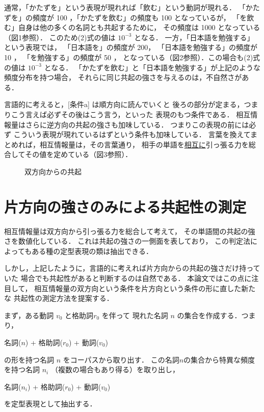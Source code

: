\addtocounter{figure}{2}

\bigskip 

\bigskip

通常，「かたずを」という表現が現れれば「飲む」という動詞が現れる．
「かたずを」の頻度が 100 ，「かたずを飲む」の頻度も 100 となっているが，
「を飲む」自身は他の多くの名詞とも共起するために，
その頻度は 1000 となっている（図1参照）．
このため(2)式の値は \( 10^{-3} \) となる．
一方，「日本語を勉強する」という表現では，
「日本語を」の頻度が 200，
「日本語を勉強する」の頻度が 10 ，
「を勉強する」の頻度が 50 ，
となっている（図2参照）．この場合も(2)式の値は \( 10^{-3} \) となる．
「かたずを飲む」と「日本語を勉強する」が上記のような頻度分布を持つ場合，
それらに同じ共起の強さを与えるのは，不自然さがある．

言語的に考えると，[条件a] は順方向に読んでいくと
後ろの部分が定まる，つまりこう言えば必ずその後はこう言う，といった
表現のもつ条件である．
相互情報量はさらに逆方向の共起の強さも加味している．
つまりこの表現の前には必ず
こういう表現が現れているはずという条件も加味している．
言葉を換えてまとめれば，相互情報量は，その言葉通り，
相手の単語を\underline{相互に}引っ張る力を総合してその値を定めている（図3参照）．



\begin{figure}[h]
\begin{center}
    
    
    
\end{center}
\caption{双方向からの共起}
\end{figure}


\section{片方向の強さのみによる共起性の測定}

相互情報量は双方向から引っ張る力を総合して考えて，
その単語間の共起の強さを数値化している．
これは共起の強さの一側面を表しており，
この判定法によってもある種の定型表現の類は抽出できる．

しかし，上記したように，言語的に考えれば片方向からの共起の強さだけ持っていた
場合でも共起性があると判断するのは自然である．
本論文ではこの点に注目して，
相互情報量の双方向という条件を片方向という条件の形に直した新たな
共起性の測定方法を提案する．

まず，ある動詞 \( v_{0} \) と格助詞\( r_{0} \) を伴って
現れた名詞 \( n \) の集合を作成する．つまり，
\begin{center}
名詞(\(n\)) + 格助詞(\(r_{0}\)) + 動詞(\(v_{0}\))  
\end{center}
の形を持つ名詞 \( n \) をコーパスから取り出す．
この名詞\( n \)の集合から特異な頻度を持つ名詞 \( n_{i} \) 
（複数の場合もあり得る）を取り出し，
\begin{center}
名詞(\( n_{i} \)) + 格助詞(\(r_{0}\)) + 動詞(\(v_{0}\))  
\end{center}
を定型表現として抽出する．


